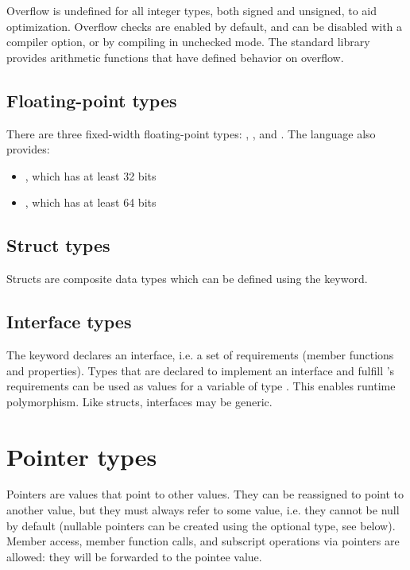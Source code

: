 Overflow is undefined for all integer types, both signed and unsigned, to aid
optimization. Overflow checks are enabled by default, and can be disabled with a
compiler option, or by compiling in unchecked mode. The standard library
provides arithmetic functions that have defined behavior on overflow.

\subsection{Floating-point types}

There are three fixed-width floating-point types: ,
, and . The language also provides:

\begin{itemize}
\item {}, which has at least 32 bits
\item {}, which has at least 64 bits
\end{itemize}

\subsection{Struct types}

Structs are composite data types which can be defined using the 
keyword.

\subsection{Interface types}

The  keyword declares an interface, i.e. a set of requirements
(member functions and properties). Types that are declared to implement an
interface  and fulfill 's requirements can be used as values for
a variable of type . This enables runtime polymorphism. Like structs,
interfaces may be generic.

\section{Pointer types}

Pointers are values that point to other values. They can be reassigned to point
to another value, but they must always refer to some value, i.e. they cannot be
null by default (nullable pointers can be created using the optional type, see
below). Member access, member function calls, and subscript operations via
pointers are allowed: they will be forwarded to the pointee value.

